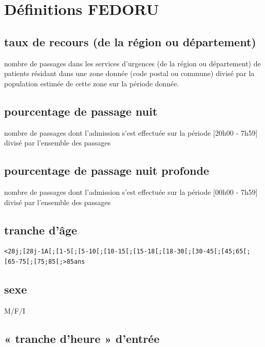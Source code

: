 \documentclass[]{article}
\begin{document}
\section{Définitions FEDORU}\label{definitions-fedoru}

\subsection{taux de recours (de la région ou
département)}\label{taux-de-recours-de-la-region-ou-departement}

nombre de passages dans les services d'urgences (de la région ou
département) de patients résidant dans une zone donnée (code postal ou
commune) divisé par la population estimée de cette zone sur la période
donnée.

\subsection{pourcentage de passage
nuit}\label{pourcentage-de-passage-nuit}

nombre de passages dont l'admission s'est effectuée sur la période
{[}20h00 - 7h59{]} divisé par l'ensemble des passages

\subsection{pourcentage de passage nuit
profonde}\label{pourcentage-de-passage-nuit-profonde}

nombre de passages dont l'admission s'est effectuée sur la période
{[}00h00 - 7h59{]} divisé par l'ensemble des passages

\subsection{tranche d'âge}\label{tranche-dage}

\begin{verbatim}
<28j;[28j-1A[;[1-5[;[5-10[;[10-15[;[15-18[;[18-30[;[30-45[;[45;65[;[65-75[;[75;85[;>85ans
\end{verbatim}

\subsection{sexe}\label{sexe-1}

M/F/I

\subsection{« tranche d'heure » d'entrée}\label{tranche-dheure-dentree}
\end{document}
